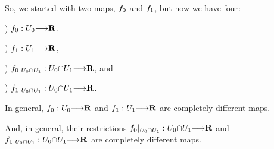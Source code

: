 So, we started with two maps, $\g{f_0}$ and $\b{f_1}$, but now we have four: \par
  ) $\g{f_0}: \g{U_0} \to \R$, \par
  ) $\b{f_1}: \b{U_1} \to \R$, \par
  ) $\g{f_0}|_{\g{U_0} \p\cap \b{U_1}}: \g{U_0} \p\cap \b{U_1} \to \R$, and \par
  ) $\b{f_1}|_{\g{U_0} \p\cap \b{U_1}}: \g{U_0} \p\cap \b{U_1} \to \R$. \par
In general, $\g{f_0}: \g{U_0} \to \R$ and $\b{f_1}: \b{U_1} \to \R$ are completely different maps. \par
And, in general, their restrictions $\g{f_0}|_{\g{U_0} \p\cap \b{U_1}}: \g{U_0} \p\cap \b{U_1} \to \R$ and $\b{f_1}|_{\g{U_0} \p\cap \b{U_1}}: \g{U_0} \p\cap \b{U_1} \to \R$ are completely different maps. \par

